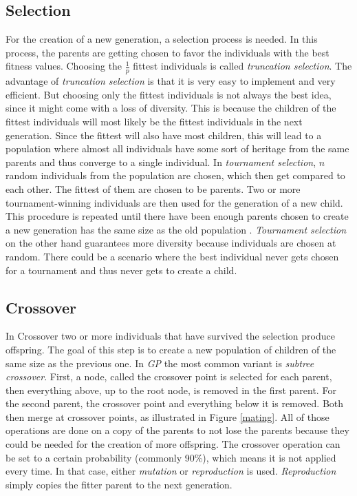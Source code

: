 \documentclass[tikz, runningheads]{llncs}
\begin{document}
\subsection{Selection}
For the creation of a new generation, a selection process is needed. 
In this process, the parents are getting chosen to favor the individuals with the best fitness values.
Choosing the $\frac{1}{p}$ fittest individuals is called \textit{truncation selection}.
The advantage of \textit{truncation selection} is that it is very easy to implement and very efficient. 
But choosing only the fittest individuals is not always the best idea, since it might come with a loss of diversity.
This is because the children of the fittest individuals will most likely be the fittest individuals
in the next generation. Since the fittest will also have most children, this will lead to a population where 
almost all individuals have some sort of heritage from the same parents and thus converge to 
a single individual. In \textit{tournament selection}, $n$
random individuals from the population are chosen, which then get compared to each other. The fittest of them 
are chosen to be parents. Two or more tournament-winning individuals are then used for the generation of a new child.  
This procedure is repeated until there have been enough parents chosen to create a new generation has the 
same size as the old population \cite{Selection}.
\textit{Tournament selection} on the other hand guarantees more diversity because individuals are chosen at random. 
There could be a scenario where the best individual never gets chosen for a tournament and thus never gets to
create a child. 

\subsection{Crossover}
In Crossover two or more individuals that have survived the selection produce offspring. The goal of this step is to 
create a new population of children of the same size as the previous one. In \textit{GP} the most common variant is 
\textit{subtree crossover}. First, a node, called the crossover point is selected for each parent, then everything 
above, up to the root node, is removed in the first parent. For the second parent, the crossover point and everything below it  
is removed. Both then merge at crossover points, as illustrated in Figure \ref{mating}. All of those 
operations are done on a copy of the parents to not lose the parents because they could be needed for the creation 
of more offspring. The crossover operation can be set to a certain probability (commonly 90\%), which means it 
is not applied every time. In that case, either \textit{mutation} or \textit{reproduction} is used. 
\textit{Reproduction} simply copies the fitter parent to the next generation. 
\end{document}
